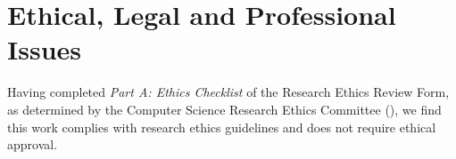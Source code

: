 \section{Ethical, Legal and Professional Issues}

Having completed \textit{Part A: Ethics Checklist} of the Research Ethics Review Form, as determined by the Computer Science Research Ethics Committee (\cite{CSREC:2020}), we find this work complies with research ethics guidelines and does not require ethical approval.



